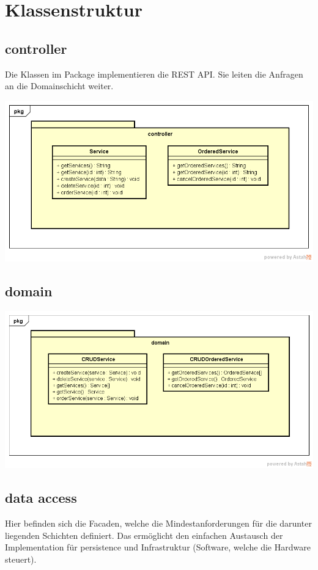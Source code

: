 \documentclass[11pt]{scrartcl}
\begin{document}
\newpage

\section{Klassenstruktur}

\subsection{controller}
Die Klassen im Package implementieren die REST API. Sie leiten die Anfragen an die Domainschicht weiter.

\begin{center}
\includegraphics[scale=0.5]{Klassenstruktur-controller}
\end{center}

\subsection{domain}
\begin{center}
\includegraphics[scale=0.5]{Klassenstruktur-domain}
\end{center}

\newpage

\subsection{data access}
Hier befinden sich die Facaden, welche die Mindestanforderungen für die darunter liegenden Schichten definiert. Das ermöglicht den einfachen Austausch der Implementation für persistence und Infrastruktur (Software, welche die Hardware steuert).
\end{document}
